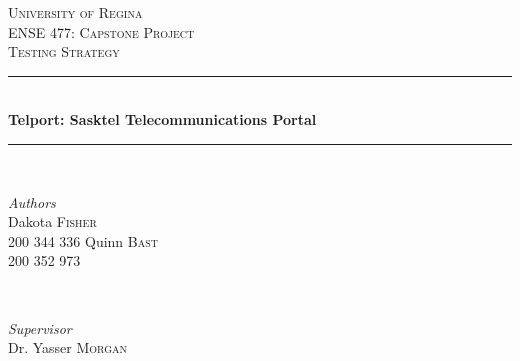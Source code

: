 \documentclass[12pt]{article}
\begin{document}

\begin{titlepage} %
	\newcommand{\HRule}{\rule{\linewidth}{0.5mm}} %
	
	\center %
	
	
	\textsc{\LARGE University of Regina}\\[1.5cm] %
	
	\textsc{\Large ENSE 477: Capstone Project}\\[0.5cm] %
	
	\textsc{\large Testing Strategy}\\[0.5cm] %
	
	
	\HRule\\[0.4cm]
	
	{\huge\bfseries Telport: Sasktel Telecommunications Portal}\\[0.4cm] %
	
	\HRule\\[1.5cm]
	
	
	\begin{minipage}[t]{0.4\textwidth}
		\begin{flushleft}
			\large
			\textit{Authors}\\
			Dakota \textsc{Fisher}\\ %
			200 344 336\newline \newline
			Quinn \textsc{Bast}\\ %
			200 352 973
		\end{flushleft}
	\end{minipage}
	~
	\begin{minipage}[t]{0.4\textwidth}
		\begin{flushright}
			\large
			\textit{Supervisor}\\
			Dr. Yasser \textsc{Morgan} %
		\end{flushright}
	\end{minipage}
	

\end{titlepage}
\end{document}
